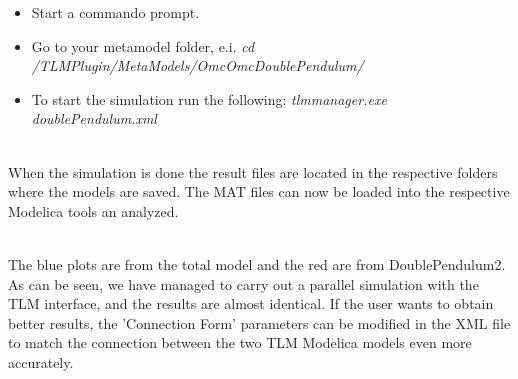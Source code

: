 \begin{itemize}
  \item Start a commando prompt.
  \item Go to your metamodel folder, e.i. 
\textit{cd /TLMPlugin/MetaModels/OmcOmcDoublePendulum/}
  \item To start the simulation run the following: \textit{tlmmanager.exe doublePendulum.xml}
\end{itemize}

~\\When the simulation is done the result files are located in the respective folders where the models are saved. 
The MAT files can now be loaded into the respective Modelica tools an analyzed.

~\\The blue plots are from the total model and the red are from DoublePendulum2. 
As can be seen, we have managed to carry out a parallel simulation with the TLM interface, and the results are almost identical. 
If the user wants to obtain better results, the 'Connection Form' parameters can be modified in the XML file to match the connection between the two TLM Modelica models even more accurately.

